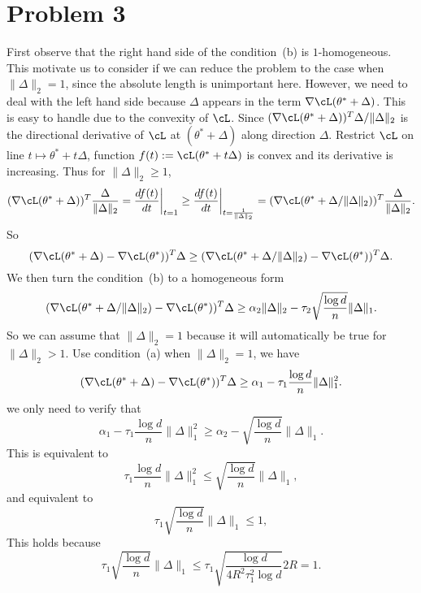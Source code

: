 \section{Problem 3}

First observe that the right hand side of the condition~(b)
is $1$-homogeneous.
This motivate us to consider if we can reduce the problem to
the case when $\|\Delta\|_2=1$,
since the absolute length is unimportant here.
However,
we need to deal with the left hand side
because $\Delta$ appears in the term $\nabla\cL(\theta^*+\Delta)$.
This is easy to handle due to the convexity of $\cL$.
Since $(\nabla\cL(\theta^*+\Delta))^T\Delta/\|\Delta\|_2$ is
the directional derivative of $\cL$ at $(\theta^*+\Delta)$
along direction $\Delta$.
Restrict $\cL$ on line $t\mapsto\theta^*+t\Delta$,
function $f(t):=\cL(\theta^*+t\Delta)$ is convex
and its derivative is increasing.
Thus for $\|\Delta\|_2\ge1$,
\begin{equation}
    (\nabla\cL(\theta^*+\Delta))^T\frac{\Delta}{\|\Delta\|_2} =
        \frac{df(t)}{dt}\bigg|_{t=1}
    \ge \frac{df(t)}{dt}\bigg|_{t=\frac{1}{\|\Delta\|_2}}
    =(\nabla\cL(\theta^*+\Delta/\|\Delta\|_2))^T\frac{\Delta}{\|\Delta\|_2}.
\end{equation}
So
\begin{equation}
    (\nabla\cL(\theta^*+\Delta)-\nabla\cL(\theta^*))^T\Delta
        \ge(\nabla\cL(\theta^*+\Delta/\|\Delta\|_2)-\nabla\cL(\theta^*))^T\Delta.
\end{equation}
We then turn the condition~(b) to a homogeneous form
\begin{equation}
    (\nabla\cL(\theta^*+\Delta/\|\Delta\|_2)-\nabla\cL(\theta^*))^T\Delta
        \ge\alpha_2\|\Delta\|_2-\tau_2\sqrt{\frac{\log d}{n}}\|\Delta\|_1.
\end{equation}
So we can assume that $\|\Delta\|_2=1$
because it will automatically be true for $\|\Delta\|_2>1$.
Use condition~(a) when $\|\Delta\|_2=1$,
we have
\begin{equation}
    (\nabla\cL(\theta^*+\Delta)-\nabla\cL(\theta^*))^T\Delta
        \ge\alpha_1-\tau_1\frac{\log d}{n}\|\Delta\|_1^2.
\end{equation}
we only need to verify that
\begin{equation}
    \alpha_1-\tau_1\frac{\log d}{n}\|\Delta\|_1^2
        \ge\alpha_2-\sqrt{\frac{\log d}{n}}\|\Delta\|_1.
\end{equation}
This is equivalent to
\begin{equation}
    \tau_1\frac{\log d}{n}\|\Delta\|_1^2
        \le\sqrt{\frac{\log d}{n}}\|\Delta\|_1,
\end{equation}
and equivalent to
\begin{equation}
    \tau_1\sqrt{\frac{\log d}{n}}\|\Delta\|_1
        \le1,
\end{equation}
This holds because
\begin{equation}
    \tau_1\sqrt{\frac{\log d}{n}}\|\Delta\|_1
        \le\tau_1\sqrt{\frac{\log d}{4R^2\tau_1^2\log d}}2R
        =1.
\end{equation}

